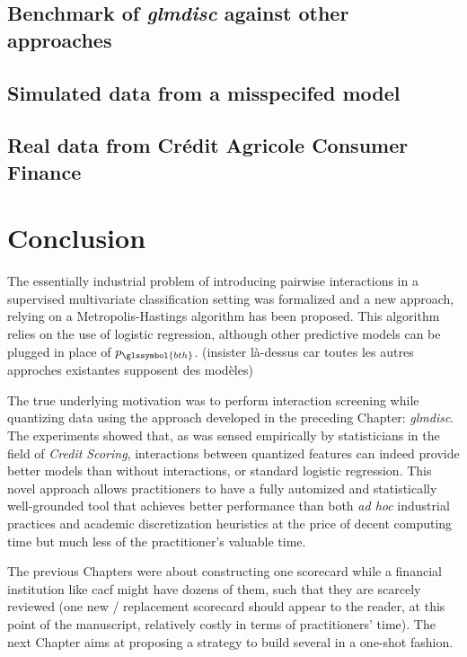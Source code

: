 \subsection{Benchmark of \textit{glmdisc} against other approaches} \label{sec:exp}

\subsection{Simulated data from a misspecifed model}

\subsection{Real data from Crédit Agricole Consumer Finance}

\section{Conclusion} \label{sec:ccl}

The essentially industrial problem of introducing pairwise interactions in a supervised multivariate classification setting was formalized and a new approach, relying on a Metropolis-Hastings algorithm has been proposed. This algorithm relies on the use of logistic regression, although other predictive models can be plugged in place of $p_{\glssymbol{bth}}$. (insister là-dessus car toutes les autres approches existantes supposent des modèles)

The true underlying motivation was to perform interaction screening while quantizing data using the approach developed in the preceding Chapter: \textit{glmdisc}.
The experiments showed that, as was sensed empirically by statisticians in the field of \textit{Credit Scoring}, interactions between quantized features can indeed provide better models than without interactions, or standard logistic regression. This novel approach allows practitioners to have a fully automized and statistically well-grounded tool that achieves better performance than both \textit{ad hoc} industrial practices and academic discretization heuristics at the price of decent computing time but much less of the practitioner's valuable time.


The previous Chapters were about constructing one scorecard while a financial institution like \gls{cacf} might have dozens of them, such that they are scarcely reviewed (one new / replacement scorecard should appear to the reader, at this point of the manuscript, relatively costly in terms of practitioners' time). The next Chapter aims at proposing a strategy to build several in a one-shot fashion.












\printbibliography[heading=subbibliography, title=References of Chapter 4]
